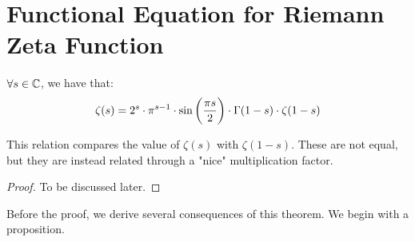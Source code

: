 \setcounter{section}{0}
\setcounter{theorem}{0}


\section{Functional Equation for Riemann Zeta Function}


\begin{theorem}
$\forall s \in \mathbb{C}$, we have that:
\begin{align*}
    \zeta(s) = 2^s \cdot \pi^{s-1} \cdot \sin\left( \frac{\pi s}{2} \right) \cdot \Gamma(1-s) \cdot \zeta(1-s)
\end{align*}

\end{theorem}

\begin{note}
This relation compares the value of $\zeta(s) $ with $\zeta (1-s)$. These are not equal, but they are instead related through a "nice" multiplication factor.
\end{note}

\begin{proof}
To be discussed later.
\end{proof}

Before the proof, we derive several consequences of this theorem. We begin with a proposition.



